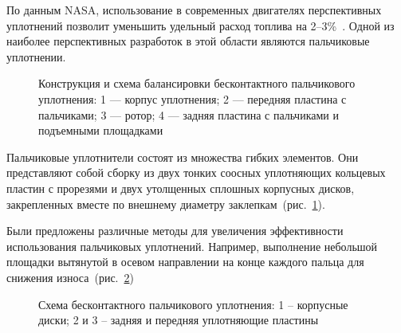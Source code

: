 \documentclass[a4paper,14pt]{extarticle}
\begin{document}
По данным NASA, использование в современных двигателях перспективных уплотнений позволит уменьшить удельный расход топлива на 2–3\%~\cite{nasa}. Одной из наиболее перспективных разработок в этой области являются
пальчиковые уплотнении.
\begin{figure}[!htbp]
	\caption{Конструкция и схема балансировки бесконтактного пальчикового
		уплотнения: 1 — корпус уплотнения; 2 — передняя пластина с пальчиками;
		3 — ротор; 4 — задняя пластина с пальчиками и подъемными площадками}
	\label{vved-1}
\end{figure}
Пальчиковые уплотнители состоят из множества гибких элементов. Они представляют собой сборку из двух тонких соосных уплотняющих кольцевых пластин с прорезями и двух утолщенных сплошных корпусных дисков, закрепленных вместе по внешнему диаметру заклепкам~(рис.~\ref{vved-1}).

Были предложены различные методы для увеличения эффективности
использования пальчиковых уплотнений. Например, выполнение небольшой
площадки вытянутой в осевом направлении на конце каждого пальца для
снижения износа~(рис.~\ref{vved-2})
\begin{figure}[!htbp]
	\caption{Схема бесконтактного пальчикового уплотнения: 1 – корпусные
		диски; 2 и 3 – задняя и передняя уплотняющие пластины}
	\label{vved-2}
\end{figure}
\end{document}
